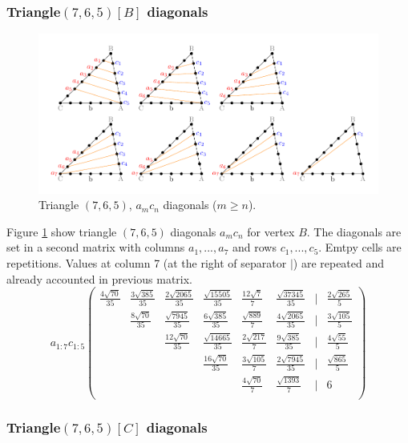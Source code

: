 \documentclass[11pt]{article}
\begin{document}
\subsubsection{Triangle$(7,6,5)[B]$ diagonals}

\begin{figure}[htp]
\centering
\includegraphics[scale=1]{t765ac}
\caption{Triangle $(7,6,5)$, $a_mc_n$ diagonals ($m \ge n$).}
\label{t765ac}
\end{figure}
Figure \ref{t765ac} show triangle $(7,6,5)$ diagonals $a_mc_n$ for vertex $B$. 
The diagonals are set in a second matrix with columns $a_1,...,a_7$ and rows $c_1,...,c_5$. Emtpy cells are repetitions.
Values at column 7 (at the right of separator $|$) are repeated and already accounted in previous matrix.
\begin{equation}\label{eq:appendrow}
a_{1:7}c_{1:5}\left(\begin{array}{cccccccc}
	\frac{4\sqrt{70}}{35} & \frac{3\sqrt{385}}{35} & \frac{2\sqrt{2065}}{35} & \frac{\sqrt{15505}}{35} & \frac{12\sqrt{7}}{7} & \frac{\sqrt{37345}}{35} & | & \frac{2\sqrt{265}}{5}\\
	& \frac{8\sqrt{70}}{35} & \frac{\sqrt{7945}}{35} & \frac{6\sqrt{385}}{35} & \frac{\sqrt{889}}{7} & \frac{4\sqrt{2065}}{35} & | & \frac{3\sqrt{105}}{5} \\
	& & \frac{12\sqrt{70}}{35} & \frac{\sqrt{14665}}{35} & \frac{2\sqrt{217}}{7} & \frac{9\sqrt{385}}{35} & | & \frac{4\sqrt{55}}{5}\\
	& & & \frac{16\sqrt{70}}{35} & \frac{3\sqrt{105}}{7} & \frac{2\sqrt{7945}}{35} & | & \frac{\sqrt{865}}{5}\\
	& & & & \frac{4\sqrt{70}}{7} & \frac{\sqrt{1393}}{7} & | & \boxed{6}\\
\end{array}\right)
\end{equation}

\subsubsection{Triangle$(7,6,5)[C]$ diagonals}
\end{document}
